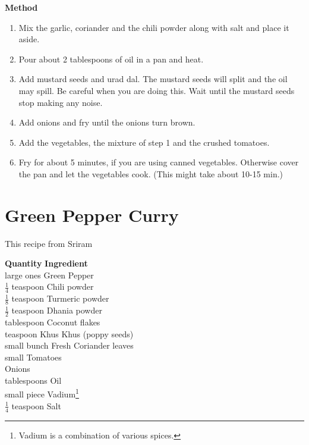 {\bf Method}
\begin{enumerate}
\item  Mix  the  garlic, coriander and the chili powder along with salt and
      place it aside.
\item Pour about 2 tablespoons of oil in a pan and heat.
\item Add mustard seeds and urad dal. The mustard seeds  will  split  and
      the  oil  may  spill.  Be careful when you are doing this. Wait until
      the mustard seeds stop making any noise.
\item Add onions and fry until the onions turn brown.
\item Add the vegetables, the mixture of step 1 and the crushed tomatoes.
\item Fry for about 5 minutes, if you are using  canned vegetables.  Otherwise
      cover the pan and let the vegetables cook. (This might take about
      10-15 min.)
\end{enumerate}

\section{Green Pepper Curry}
  This recipe from Sriram

\begin{minipage}{7in}
\begin{tabbing}
\hspace{1.0cm}  \={\bf Quantity}   \hspace{3.0cm} \={\bf Ingredient}\\
  large ones    \>Green Pepper\\
 \>$\frac{1}{4}$ teaspoon   \>Chili powder\\
 \>$\frac{1}{8}$ teaspoon   \>Turmeric powder\\
 \>$\frac{1}{2}$ teaspoon   \>Dhania powder\\
  tablespoon   \>Coconut flakes\\
  teaspoon     \>Khus Khus (poppy seeds) \\
  small bunch  \>Fresh Coriander leaves\\
  small        \>Tomatoes \\
               \>Onions\\
  tablespoons  \>Oil\\
 small piece   \>Vadium\footnote{Vadium is a combination of various spices.} \\
 $\frac{1}{4}$ teaspoon   \>Salt \\
\end{tabbing}
\end{minipage}

